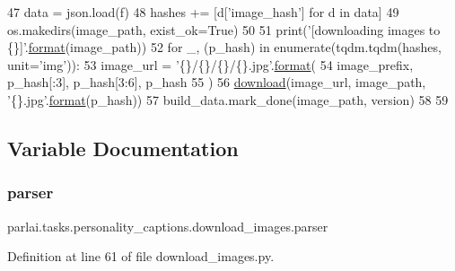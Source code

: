 \begin{DoxyCode}
47             data = json.load(f)
48             hashes += [d[\textcolor{stringliteral}{'image\_hash'}] \textcolor{keywordflow}{for} d \textcolor{keywordflow}{in} data]
49     os.makedirs(image\_path, exist\_ok=\textcolor{keyword}{True})
50 
51     print(\textcolor{stringliteral}{'[downloading images to \{\}]'}.\hyperlink{namespaceparlai_1_1chat__service_1_1services_1_1messenger_1_1shared__utils_a32e2e2022b824fbaf80c747160b52a76}{format}(image\_path))
52     \textcolor{keywordflow}{for} \_, (p\_hash) \textcolor{keywordflow}{in} enumerate(tqdm.tqdm(hashes, unit=\textcolor{stringliteral}{'img'})):
53         image\_url = \textcolor{stringliteral}{'\{\}/\{\}/\{\}/\{\}.jpg'}.\hyperlink{namespaceparlai_1_1chat__service_1_1services_1_1messenger_1_1shared__utils_a32e2e2022b824fbaf80c747160b52a76}{format}(
54             image\_prefix, p\_hash[:3], p\_hash[3:6], p\_hash
55         )
56         \hyperlink{namespaceparlai_1_1core_1_1build__data_ab74f0e428f05e5d91fa93c8afb367622}{download}(image\_url, image\_path, \textcolor{stringliteral}{'\{\}.jpg'}.\hyperlink{namespaceparlai_1_1chat__service_1_1services_1_1messenger_1_1shared__utils_a32e2e2022b824fbaf80c747160b52a76}{format}(p\_hash))
57     build\_data.mark\_done(image\_path, version)
58 
59 
\end{DoxyCode}


\subsection{Variable Documentation}
\mbox{\label{namespaceparlai_1_1tasks_1_1personality__captions_1_1download__images_ad569e6f3e90709b66c27bc16b83e9275}} 
\subsubsection{\texorpdfstring{parser}{parser}}
{\footnotesize\ttfamily parlai.\+tasks.\+personality\+\_\+captions.\+download\+\_\+images.\+parser}



Definition at line 61 of file download\+\_\+images.\+py.

